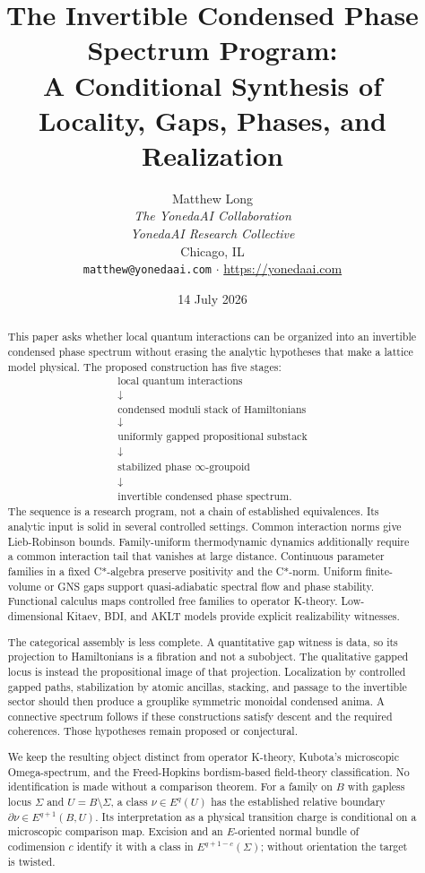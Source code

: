 \documentclass[12pt]{article}
\title{The Invertible Condensed Phase Spectrum Program:\\
A Conditional Synthesis of Locality, Gaps, Phases, and Realization}
\author{Matthew Long \\
\textit{The YonedaAI Collaboration} \\
\textit{YonedaAI Research Collective} \\
Chicago, IL \\
\texttt{matthew@yonedaai.com} $\cdot$ \url{https://yonedaai.com}}
\date{14 July 2026}
\theoremstyle{definition}
\theoremstyle{remark}
\begin{document}
\maketitle

\begin{abstract}
This paper asks whether local quantum interactions can be organized into an
invertible condensed phase spectrum without erasing the analytic hypotheses
that make a lattice model physical.  The proposed construction has five
stages:
\[
\boxed{
\begin{array}{c}
\text{local quantum interactions}\\
\downarrow\\
\text{condensed moduli stack of Hamiltonians}\\
\downarrow\\
\text{uniformly gapped propositional substack}\\
\downarrow\\
\text{stabilized phase }\infty\text{-groupoid}\\
\downarrow\\
\text{invertible condensed phase spectrum}.
\end{array}}
\]
The sequence is a research program, not a chain of established equivalences.
Its analytic input is solid in several controlled settings.  Common
interaction norms give Lieb-Robinson bounds.  Family-uniform thermodynamic
dynamics additionally require a common interaction tail that vanishes at
large distance.
Continuous parameter families in a fixed C*-algebra preserve positivity and
the C*-norm.  Uniform finite-volume or GNS gaps support quasi-adiabatic
spectral flow and phase stability.  Functional calculus maps controlled free
families to operator K-theory.  Low-dimensional Kitaev, BDI, and AKLT models
provide explicit realizability witnesses.

The categorical assembly is less complete.  A quantitative gap witness is
data, so its projection to Hamiltonians is a fibration and not a subobject.
The qualitative gapped locus is instead the propositional image of that
projection.  Localization by controlled gapped paths, stabilization by
atomic ancillas, stacking, and passage to the invertible sector should then
produce a grouplike symmetric monoidal condensed anima.  A connective
spectrum follows if these constructions satisfy descent and the required
coherences.  Those hypotheses remain proposed or conjectural.

We keep the resulting object distinct from operator K-theory, Kubota's
microscopic Omega-spectrum, and the Freed-Hopkins bordism-based field-theory
classification.  No identification is made without a comparison theorem.
For a family on $B$ with gapless locus $\Sigma$ and
$U=B\setminus\Sigma$, a class $\nu\in E^q(U)$ has the established relative
boundary $\partial\nu\in E^{q+1}(B,U)$.  Its interpretation as a physical
transition charge is conditional on a microscopic comparison map.  Excision
and an $E$-oriented normal bundle of codimension $c$ identify it with a class
in $E^{q+1-c}(\Sigma)$; without orientation the target is twisted.


\end{abstract}
\end{document}
